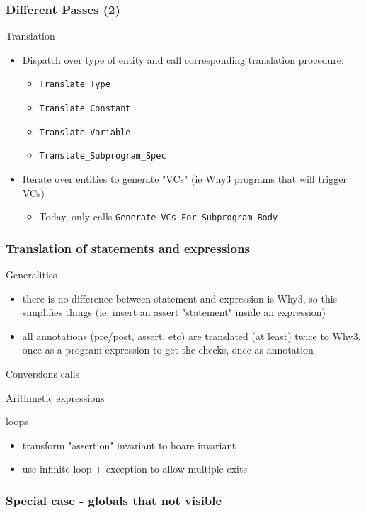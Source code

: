 \documentclass{beamer}
\newenvironment{specialframe}{%
  \begin{frame}[fragile,environment=specialframe]}{\end{frame}}
\begin{document}
\begin{specialframe}\frametitle{Different Passes (2) }
   \begin{block}{Translation}
      \begin{itemize}
         \item Dispatch over type of entity and call corresponding translation
            procedure:
            \begin{itemize}
                  \item \verb|Translate_Type|
                  \item \verb|Translate_Constant|
                  \item \verb|Translate_Variable|
                  \item \verb|Translate_Subprogram_Spec|
            \end{itemize}
         \item Iterate over entities to generate "VCs" (ie Why3 programs that
            will trigger VCs)
            \begin{itemize}
               \item Today, only calls \verb|Generate_VCs_For_Subprogram_Body|
            \end{itemize}
      \end{itemize}
   \end{block}
\end{specialframe}

\begin{specialframe}\frametitle{Translation of statements and expressions}
   \begin{block}{Generalities}
      \begin{itemize}
         \item there is no difference between statement and expression is Why3,
               so this simplifies things (ie. insert an assert "statement"
               inside an expression)
         \item all annotations (pre/post, assert, etc) are translated (at
least) twice to Why3, once as a program expression to get the checks, once as
annotation
      \end{itemize}
      
   \end{block}

   \begin{block}{Conversions}
      calls
   \end{block}

   \begin{block}{Arithmetic expressions}
   \end{block}

   \begin{block}{loops}
      \begin{itemize}
         \item transform "assertion" invariant to hoare invariant
         \item use infinite loop + exception to allow multiple exits
      \end{itemize}
   \end{block}

\end{specialframe}

\begin{specialframe}\frametitle{Special case - globals that not visible}
\end{specialframe}
\end{document}
